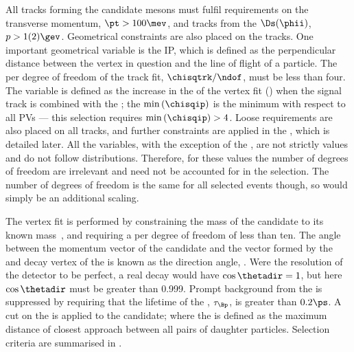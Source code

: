 All tracks forming the candidate mesons must fulfil requirements on the transverse momentum,
$\pt>100\mev$, and tracks from the $\Ds(\phii)$, $p>1(2)\gev$.
Geometrical constraints are also placed on the tracks.
One important geometrical variable is the \gls{IP}, which is defined as the perpendicular distance
between the vertex in question and the line of flight of a particle.
The \chisq per degree of freedom of the track fit, $\chisqtrk/\ndof$, must be less than four.
The variable \chisqip is defined as the increase in the \chisq of the vertex fit (\chisqvtx) when
the signal track is combined with the \pv; the $\min\left(\chisqip\right)$ is the minimum \chisqip
with respect to all \glspl{PV} --- this selection requires $\min\left(\chisqip\right)>4$.
Loose \pid requirements are also placed on all tracks, and further \pid constraints are applied in
the \bdt, which is detailed later.
All the \chisq variables, with the exception of the \chisqtrk, are not strictly \chisq values and
do not follow \chisq distributions.
Therefore, for these values the number of degrees of freedom are irrelevant and need not be
accounted for in the selection.
The number of degrees of freedom is the same for all selected events though, so would simply be an
additional scaling.


The \Bp vertex fit is performed by constraining the mass of the \Ds candidate to its known
mass~\cite{PDG2012}, and requiring a \chisqvtx per degree of freedom of
less than ten.
The angle between the momentum vector of the \Bp candidate and
the vector formed by the \pv and decay vertex of the \Bp is known as the direction angle,
\thetadir.
Were the resolution of the \lhcb detector to be perfect, a real decay would have $\cos\thetadir=1$,
but here $\cos\thetadir$ must be greater than 0.999.
Prompt background from the \pv is suppressed by requiring that the lifetime of the \Bp,
$\tau_{\Bp}$, is greater than $0.2\ps$.
A cut on the \DOCA is applied to the \Ds candidate; where the \DOCA is defined as the maximum
distance of closest approach between all pairs of daughter particles.
Selection criteria are summarised in .


